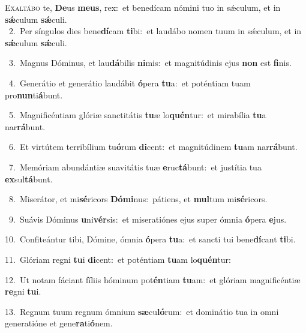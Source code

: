 \lettrine{\initial\textcolor{\initialcolor}{E}}{xaltábo} te, \textbf{De}\-us \textbf{me}\-\textbf{us}, rex:~\star et benedícam nómini tuo in sǽculum, et in \textbf{sǽ}\-culum \textbf{sǽ}\-culi.\\
{\numbfont\textcolor{\numbcolor}{~2.}}~Per síngulos dies bene\-\textbf{dí}\-cam \textbf{ti}\-bi:~\star et laudábo nomen tuum in sǽculum, et in \textbf{sǽ}\-culum \textbf{sǽ}\-culi.\par
{\numbfont\textcolor{\numbcolor}{~3.}}~Magnus Dóminus, et lau\-\textbf{dá}\-bilis \textbf{ni}\-mis:~\star et magnitúdinis ejus \textbf{non} est \textbf{fi}\-nis.\par
{\numbfont\textcolor{\numbcolor}{~4.}}~Generátio et generátio laudábit \textbf{ó}\-pera \textbf{tu}\-a:~\star et poténtiam tuam pro\-\textbf{nun}\-ti\-\textbf{á}\-bunt.\par
{\numbfont\textcolor{\numbcolor}{~5.}}~Magnificéntiam glóriæ sanctitátis \textbf{tu}\-æ lo\-\textbf{quén}\-tur:~\star et mirabília \textbf{tu}\-a nar\-\textbf{rá}\-bunt.\par
{\numbfont\textcolor{\numbcolor}{~6.}}~Et virtútem terribílium tu\-\textbf{ó}\-rum \textbf{di}\-cent:~\star et magnitúdinem \textbf{tu}\-am nar\-\textbf{rá}\-bunt.\par
{\numbfont\textcolor{\numbcolor}{~7.}}~Memóriam abundántiæ suavitátis tuæ \textbf{e}\-ruc\-\textbf{tá}\-bunt:~\star et justítia tua \textbf{ex}\-sul\-\textbf{tá}\-bunt.\par
{\numbfont\textcolor{\numbcolor}{~8.}}~Miserátor, et mi\-\textbf{sé}\-ricors \textbf{Dó}\-\textbf{mi}nus:~\star pátiens, et \textbf{mul}\-tum mi\-\textbf{sé}\-ricors.\par
{\numbfont\textcolor{\numbcolor}{~9.}}~Suávis Dóminus \textbf{u}\-ni\-\textbf{vér}\-sis:~\star et miseratiónes ejus super ómnia \textbf{ó}\-pera \textbf{e}\-jus.\par
{\numbfont\textcolor{\numbcolor}{10.}}~Confiteántur tibi, Dómine, ómnia \textbf{ó}\-pera \textbf{tu}\-a:~\star et sancti tui bene\-\textbf{dí}\-cant \textbf{ti}\-bi.\par
{\numbfont\textcolor{\numbcolor}{11.}}~Glóriam regni \textbf{tu}\-i \textbf{di}\-cent:~\star et poténtiam \textbf{tu}\-am lo\-\textbf{quén}\-tur:\par
{\numbfont\textcolor{\numbcolor}{12.}}~Ut notam fáciant fíliis hóminum pot\-\textbf{én}\-tiam \textbf{tu}\-am:~\star et glóriam magnificéntiæ \textbf{re}\-gni \textbf{tu}\-i.\par
{\numbfont\textcolor{\numbcolor}{13.}}~Regnum tuum regnum ómnium \textbf{sæ}\-cu\-\textbf{ló}\-rum:~\star et dominátio tua in omni generatióne et gene\-\textbf{ra}\-ti\-\textbf{ó}\-nem.\par
